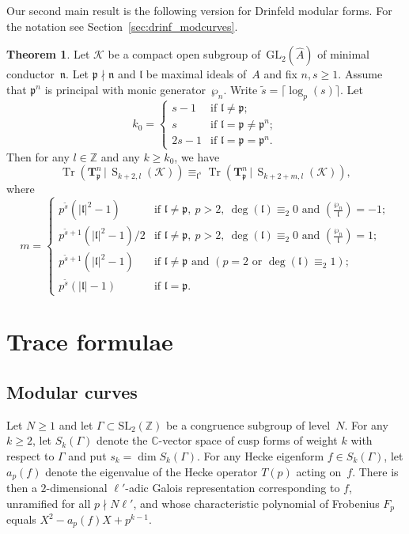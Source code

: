 \documentclass[10pt]{article}
\theoremstyle{definition}
\newtheorem{theorem}{Theorem}[section]
\DeclareMathOperator\Tr{Tr}
\renewcommand{\:}{\colon}
\newcommand{\T}{\mathbf{T}}
\renewcommand{\S}{\operatorname{S}}
\renewcommand{\l}{\mathfrak{l}}
\begin{document}
Our second main result is the following version for Drinfeld modular forms. For the notation see Section~\ref{sec:drinf_modcurves}.

\begin{theorem}\label{thm:trace_periodicity_ff}
    Let $\mathcal{K}$ be a compact open subgroup of~$\mathrm{GL}_2(\hat{A})$ of minimal conductor~$\mathfrak n$. Let $\mathfrak p \nmid \mathfrak n$ and $\mathfrak l$ be maximal ideals of~$A$ and fix $n, s \geq 1$. Assume that $\mathfrak p^n$ is principal with monic generator~$\wp_n$. Write $\tilde{s} = \lceil \log_p(s) \rceil$. Let 
    \[
    k_0 = \begin{cases} s-1 & \text{if } \l \neq \mathfrak p; \\ s & \text{if } \l = \mathfrak p \neq \mathfrak p^n; \\
    2s-1 & \text{if } \l = \mathfrak p = \mathfrak p^n.
    \end{cases}
    \]
    Then for any $l \in \mathbb Z$ and any $k \geq k_0$, we have
    \[
    \Tr(\T_{\mathfrak p}^n \, | \, \S_{k+2,l}(\mathcal{K})) \equiv_{\l^s} \Tr(\T_{\mathfrak p}^n \, | \, \S_{k+2+m,l}(\mathcal{K})),
    \]
    where
    \[
    m = \begin{cases}
        p^{\tilde{s}}(|\l|^2-1) & \text{if } \l \neq \mathfrak p, \ p>2, \ \deg(\l) \equiv_2 0 \text{ and } \left( \frac{\wp_n}{\l} \right) = -1;\\
        p^{\tilde{s}+1}(|\l|^2-1)/2 & \text{if }\l \neq \mathfrak p, \ p>2,\ \deg(\l) \equiv_2 0 \text{ and } \left( \frac{\wp_n}{\l} \right) = 1;\\
        p^{\tilde{s}+1}(|\l|^2-1) & \text{if } \l \neq \mathfrak p \text{ and } (p = 2 \text{ or } \deg(\l) \equiv_2 1);\\
        p^{\tilde{s}}(|\l|-1) & \text{if } \l = \mathfrak p.
    \end{cases}
    \]
\end{theorem}

\section{Trace formulae}\label{sec:formulae}
\subsection{Modular curves}\label{sec:mod_curves}

Let $N\geq 1$ and let $\Gamma \subset \mathrm{SL}_2(\mathbb Z)$ be a congruence subgroup of level~$N$.
For any $k\geq 2$, let $S_{k}(\Gamma)$ denote the $\mathbb C$-vector space of cusp forms of weight $k$ with respect to $\Gamma$ and put $s_{k}=\dim S_{k}(\Gamma)$. For any Hecke eigenform $f \in S_k(\Gamma)$, let $a_p(f)$ denote the eigenvalue of the Hecke operator $T(p)$ acting on~$f$. There is then a $2$-dimensional $\ell'$-adic Galois representation corresponding to $f$, unramified for all $p \nmid N\ell'$, and whose characteristic polynomial of Frobenius $F_p$ equals $X^2-a_p(f)X+p^{k-1}$. 
\end{document}
